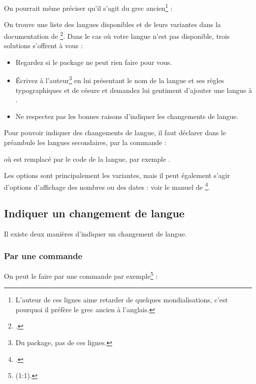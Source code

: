 On pourrait même préciser qu'il s'agit du grec ancien\footnote{L'auteur de ces lignes aime retarder de quelques mondialisations, c'est pourquoi il préfère le grec ancien à l'anglais.} : 

\begin{latexcode}
\setmainlanguage[variant=ancient]{greek}
\end{latexcode}


On trouve une liste des langues disponibles et de leurs variantes dans la documentation de \footcite{polyglossia}. Dans le cas où votre langue n'est pas disponible, trois solutions s'offrent à vous :
\begin{itemize}
\item Regardez si le package  ne peut rien faire pour vous. 
\item Écrivez à l'auteur\footnote{Du package, pas de ces lignes.} en lui présentant le nom de la langue et ses règles typographiques et de césure et demandez lui gentiment d'ajouter une langue à .
\item Ne respectez pas les bonnes raisons d'indiquer les changements de langue.
\end{itemize}

Pour pouvoir indiquer des changements de langue, il faut déclarer dans le préambule les langues secondaires, par la commande : 


 où  est remplacé par le code de la langue, par exemple .

Les options sont principalement les variantes, mais il peut également s'agir d'options d'affichage des nombres ou des dates : voir le manuel de \footcite{polyglossia_options}.

\subsection{Indiquer un changement de langue}\label{changerlang}

Il existe deux manières d'indiquer un changement de langue.

\subsubsection{Par une commande}

On peut le faire par une commande 
 par exemple\footnote{(1:1).} : 

